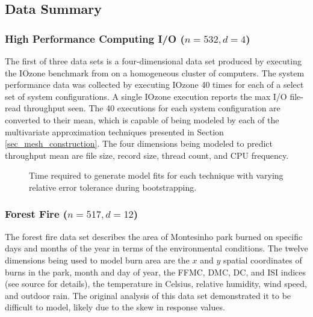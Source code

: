 \documentclass[smallextended]{svjour3}       %
\begin{document}
\subsection{Data Summary}

\subsubsection{High Performance Computing I/O ($n = 532, d = 4$)}
The first of three data sets is a four-dimensional data set produced by executing the IOzone benchmark from \cite{iozone} on a homogeneous cluster of computers. The system performance data was collected by executing IOzone 40 times for each of a select set of system configurations. A single IOzone execution reports the max I/O file-read throughput seen. The 40 executions for each system configuration are converted to their mean, which is capable of being modeled by each of the multivariate approximation techniques presented in Section \ref{sec_mesh_construction}. The four dimensions being modeled to predict throughput mean are file size, record size, thread count, and CPU frequency.

\begin{figure}[htb]
  \caption{Time required to generate model fits for each technique with varying relative error tolerance during bootstrapping.
    \vspace{-.3cm}}
  \label{fig_eval_times}
\end{figure}

\subsubsection{Forest Fire ($n = 517, d = 12$)}
The forest fire data set \cite{cortez2007data} describes the area of Montesinho park burned on specific days and months of the year in terms of the environmental conditions. The twelve dimensions being used to model burn area are the $x$ and $y$ spatial coordinates of burns in the park, month and day of year, the FFMC, DMC, DC, and ISI indices (see source for details), the temperature in Celsius, relative humidity, wind speed, and outdoor rain. The original analysis of this data set demonstrated it to be difficult to model, likely due to the skew in response values.
\end{document}
